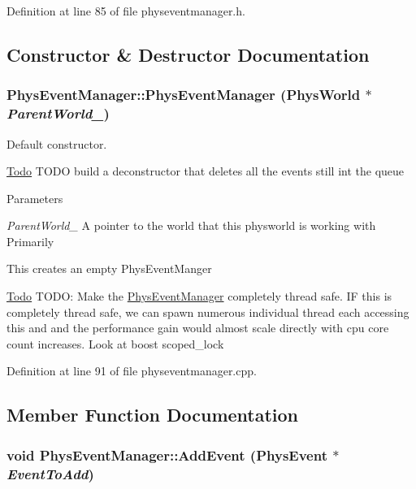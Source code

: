 Definition at line 85 of file physeventmanager.h.

\subsection{Constructor \& Destructor Documentation}
\hypertarget{classPhysEventManager_a1355f36d99de303cec6f3b27cadaa9ff}{
\subsubsection[{PhysEventManager}]{\setlength{\rightskip}{0pt plus 5cm}PhysEventManager::PhysEventManager ({\bf PhysWorld} $\ast$ {\em ParentWorld\_\-})}}
\label{d5/dd7/classPhysEventManager_a1355f36d99de303cec6f3b27cadaa9ff}


Default constructor. \begin{Desc}
\item[\hyperlink{todo__todo000006}{Todo}]TODO build a deconstructor that deletes all the events still int the queue \end{Desc}

\begin{DoxyParams}{Parameters}
\item[{\em ParentWorld\_\-}]A pointer to the world that this physworld is working with Primarily\end{DoxyParams}
This creates an empty PhysEventManger

\begin{Desc}
\item[\hyperlink{todo__todo000005}{Todo}]TODO: Make the \hyperlink{classPhysEventManager}{PhysEventManager} completely thread safe. IF this is completely thread safe, we can spawn numerous individual thread each accessing this and and the performance gain would almost scale directly with cpu core count increases. Look at boost scoped\_\-lock \end{Desc}


Definition at line 91 of file physeventmanager.cpp.

\subsection{Member Function Documentation}
\hypertarget{classPhysEventManager_a7c9bb46b17f6d9245817a402dc6a2f6f}{
\subsubsection[{AddEvent}]{\setlength{\rightskip}{0pt plus 5cm}void PhysEventManager::AddEvent ({\bf PhysEvent} $\ast$ {\em EventToAdd})}}
\label{d5/dd7/classPhysEventManager_a7c9bb46b17f6d9245817a402dc6a2f6f}



